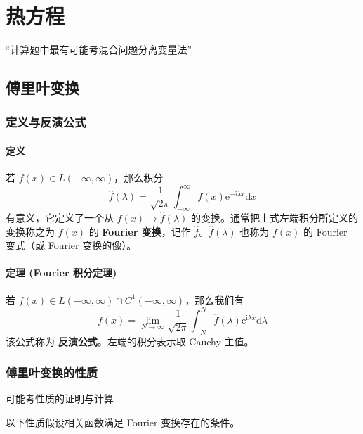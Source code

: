 \documentclass[12pt,a4paper]{ctexart}
\begin{document}
	\section{热方程}

	“计算题中最有可能考混合问题分离变量法”
	
	\subsection{傅里叶变换}
	\subsubsection{定义与反演公式}
	
	\paragraph{定义} 
	若 $f(x) \in L(-\infty, \infty)$，那么积分
	\begin{equation}
		\hat{f}(\lambda) = \frac{1}{\sqrt{2\pi}} \int_{-\infty}^{\infty} f(x) \mathrm{e}^{-\mathrm{i}\lambda x} \mathrm{d}x
	\end{equation}
	有意义，它定义了一个从 $f(x) \to \hat{f}(\lambda)$ 的变换。通常把上式左端积分所定义的变换称之为 $f(x)$ 的 \textbf{Fourier 变换}，记作 $\hat{f}$。$\hat{f}(\lambda)$ 也称为 $f(x)$ 的 Fourier 变式（或 Fourier 变换的像）。
	
	\paragraph{定理 (Fourier 积分定理)}
	若 $f(x) \in L(-\infty, \infty) \cap C^1(-\infty, \infty)$，那么我们有
	\begin{equation}
		f(x) = \lim_{N \to \infty} \frac{1}{\sqrt{2\pi}} \int_{-N}^{N} \hat{f}(\lambda) \mathrm{e}^{\mathrm{i}\lambda x} \mathrm{d}\lambda
	\end{equation}
	该公式称为 \textbf{反演公式}。左端的积分表示取 Cauchy 主值。
	
	\subsubsection{傅里叶变换的性质}
	
	可能考性质的证明与计算
	
	以下性质假设相关函数满足 Fourier 变换存在的条件。
	
\end{document}
